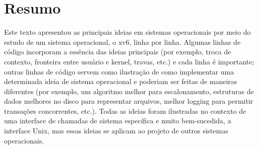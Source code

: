 \chapter{Resumo}
\label{CH:SUM}

Este texto apresentou as principais ideias em sistemas operacionais por meio do estudo de um sistema operacional, o xv6, linha por linha. Algumas linhas de código incorporam a essência das ideias 
principais (por exemplo, troca de contexto, fronteira entre usuário e kernel, travas, etc.) e cada linha é importante; outras linhas de código servem como ilustração de como implementar uma determinada 
ideia de sistema operacional e poderiam ser feitas de maneiras diferentes (por exemplo, um algoritmo melhor para escalonamento, estruturas de dados melhores no disco para representar arquivos, melhor 
logging para permitir transações concorrentes, etc.). Todas as ideias foram ilustradas no contexto de uma interface de chamadas de sistema específica e muito bem-sucedida, a interface Unix, mas essas 
ideias se aplicam ao projeto de outros sistemas operacionais.
